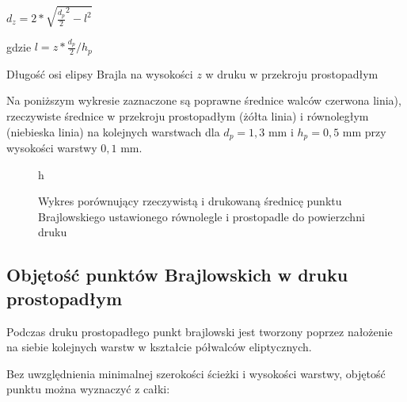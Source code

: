 \documentclass[12pt,a4paper]{article}
\begin{document}
\begin{feq}
$d_z = 2 * \sqrt{\frac{d_p}{2}^2 - l^2}$

gdzie $l = z * \frac{d_p}{2} / h_p$
\caption{Długość osi elipsy Brajla na wysokości $z$ w druku w przekroju prostopadłym}
\end{feq}

Na poniższym wykresie zaznaczone są poprawne średnice walców czerwona linia), rzeczywiste średnice w przekroju prostopadłym (żółta linia)  i równoległym (niebieska linia) na kolejnych warstwach dla $d_p = 1{,}3 \text{ mm}$ i $h_p = 0{,}5 \text{ mm}$ przy wysokości warstwy $0{,}1 \text{ mm}$.

\begin{figure}{h}
\caption{Wykres porównujący rzeczywistą i drukowaną średnicę punktu Brajlowskiego ustawionego równolegle i prostopadle do powierzchni druku}
\end{figure}

\subsection{Objętość punktów Brajlowskich w druku prostopadłym}
Podczas druku prostopadłego punkt brajlowski jest tworzony poprzez nałożenie na siebie kolejnych warstw w kształcie półwalców eliptycznych.

Bez uwzględnienia minimalnej szerokości ścieżki i wysokości warstwy, objętość punktu można wyznaczyć z całki:
\end{document}
